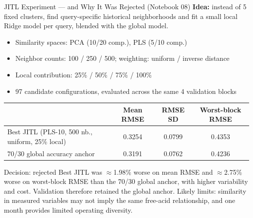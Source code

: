 \documentclass[11pt,aspectratio=169]{beamer}
\begin{document}
\begin{frame}{JITL Experiment — and Why It Was Rejected (Notebook 08)}
\textbf{Idea:} instead of 5 fixed clusters, find query-specific historical neighborhoods and fit a small local Ridge model per query, blended with the global model.
\begin{itemize}
    \small
    \item Similarity spaces: PCA (10/20 comp.), PLS (5/10 comp.)
    \item Neighbor counts: 100 / 250 / 500; weighting: uniform / inverse distance
    \item Local contribution: 25\% / 50\% / 75\% / 100\%
    \item 97 candidate configurations, evaluated across the same 4 validation blocks
\end{itemize}
\begin{center}
\scriptsize
\begin{tabular}{lccc}
\toprule
& \textbf{Mean RMSE} & \textbf{RMSE SD} & \textbf{Worst-block RMSE} \\
\midrule
Best JITL (PLS-10, 500 nb., uniform, 25\% local) & 0.3254 & 0.0799 & 0.4353 \\
70/30 global accuracy anchor & 0.3191 & 0.0762 & 0.4236 \\
\bottomrule
\end{tabular}
\end{center}
\begin{alertblock}{Decision: rejected}
\small Best JITL was $\approx$1.98\% worse on mean RMSE and $\approx$2.75\% worse on worst-block RMSE than the 70/30 global anchor, with higher variability and cost. Validation therefore retained the global anchor. Likely limits: similarity in measured variables may not imply the same free-acid relationship, and one month provides limited operating diversity.
\end{alertblock}
\end{frame}
\end{document}

